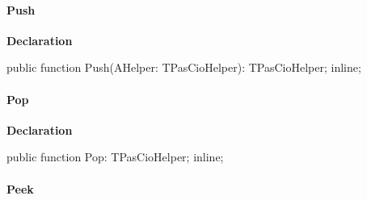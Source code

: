 \documentclass{report}
\newif\ifpdf
\begin{document}
\paragraph*{Push}\hspace*{\fill}

\label{PasDoc_Parser.TPasCioHelperStack-Push}
\begin{list}{}{
\setlength{\itemindent}{0cm}
\setlength{\listparindent}{0cm}
\setlength{\leftmargin}{\evensidemargin}
\addtolength{\leftmargin}{\tmplength}
\settowidth{\labelsep}{X}
\addtolength{\leftmargin}{\labelsep}
\setlength{\labelwidth}{\tmplength}
}
\item[\textbf{Declaration}\hfill]
\ifpdf
\begin{flushleft}
\fi
\begin{ttfamily}
public function Push(AHelper: TPasCioHelper): TPasCioHelper; inline;\end{ttfamily}

\ifpdf
\end{flushleft}
\fi

\end{list}
\paragraph*{Pop}\hspace*{\fill}

\label{PasDoc_Parser.TPasCioHelperStack-Pop}
\begin{list}{}{
\setlength{\itemindent}{0cm}
\setlength{\listparindent}{0cm}
\setlength{\leftmargin}{\evensidemargin}
\addtolength{\leftmargin}{\tmplength}
\settowidth{\labelsep}{X}
\addtolength{\leftmargin}{\labelsep}
\setlength{\labelwidth}{\tmplength}
}
\item[\textbf{Declaration}\hfill]
\ifpdf
\begin{flushleft}
\fi
\begin{ttfamily}
public function Pop: TPasCioHelper; inline;\end{ttfamily}

\ifpdf
\end{flushleft}
\fi

\end{list}
\paragraph*{Peek}\hspace*{\fill}
\end{document}
